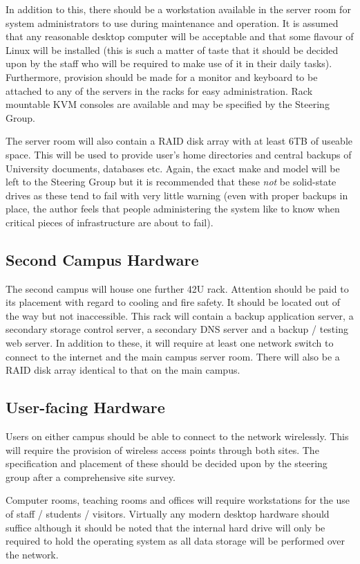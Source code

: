 \documentclass[a4paper, twoside]{article}
\begin{document}
In addition to this, there should be a workstation available in the server room
for system administrators to use during maintenance and operation. It is assumed
that any reasonable desktop computer will be acceptable and that some flavour of
Linux will be installed (this is such a matter of taste that it should be
decided upon by the staff who will be required to make use of it in their daily
tasks). Furthermore, provision should be made for a monitor and keyboard to be
attached to any of the servers in the racks for easy administration. Rack
mountable KVM consoles are available and may be specified by the Steering Group.

The server room will also contain a RAID disk array with at least 6TB of useable
space. This will be used to provide user's home directories and central backups
of University documents, databases etc. Again, the exact make and model will be
left to the Steering Group but it is recommended that these \emph{not} be
solid-state drives as these tend to fail with very little warning (even with
proper backups in place, the author feels that people administering the system
like to know when critical pieces of infrastructure are about to fail).

\subsection{Second Campus Hardware}
\label{sec:secrack}
The second campus will house one further 42U rack. Attention should be paid to
its placement with regard to cooling and fire safety. It should be located out
of the way but not inaccessible. This rack will contain a backup application
server, a secondary storage control server, a secondary DNS server and a
backup / testing web server. In addition to these, it will require at least one
network switch to connect to the internet and the main campus server room. There
will also be a RAID disk array identical to that on the main campus.

\subsection{User-facing Hardware}
Users on either campus should be able to connect to the network wirelessly. This
will require the provision of wireless access points through both sites. The
specification and placement of these should be decided upon by the steering
group after a comprehensive site survey.

Computer rooms, teaching rooms and offices will require workstations for the use
of staff / students / visitors. Virtually any modern desktop hardware should suffice
although it should be noted that the internal hard drive will only be required
to hold the operating system as all data storage will be performed over the
network.
\end{document}
